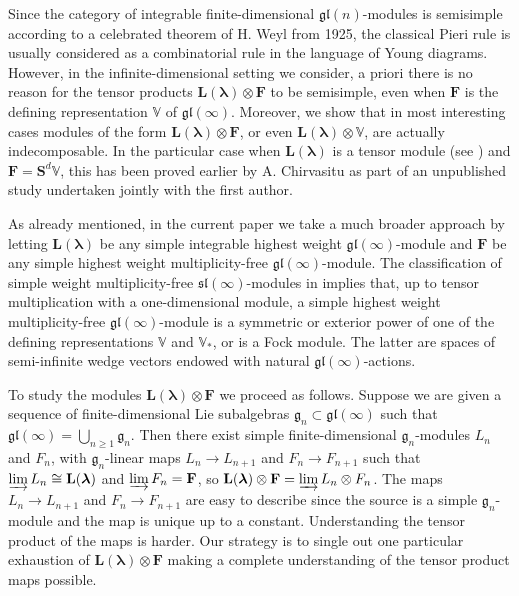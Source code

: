 \documentclass[11pt,fleqn]{amsart}
\renewcommand\to{\longrightarrow}
\theoremstyle{definition}
\theoremstyle{remark}
\theoremstyle{remark}
\newcommand\VV{\mathbb V}
\newcommand\gl{\mathfrak{gl}}
\renewcommand\sl{\mathfrak{sl}}
\renewcommand\SS{\mathbf S}
\newcommand\lie[1]{\mathfrak{#1}}
\newcommand\wt[1]{\boldsymbol{#1}}
\begin{document}
Since the category of integrable finite-dimensional $\gl(n)$-modules is 
semisimple according to a celebrated theorem of H. Weyl from 1925, the 
classical Pieri rule is usually considered as a combinatorial rule in the 
language of Young diagrams. However, in the infinite-dimensional setting we 
consider, a priori there is no reason for the tensor products $\mathbf 
L(\wt\lambda) \otimes \mathbf F$ to be semisimple, even when $\mathbf F$ is the 
defining representation $\VV$ of $\gl(\infty)$. Moreover, we show that in most 
interesting cases modules of the form $\mathbf L(\wt\lambda) \otimes \mathbf 
F$, or even $\mathbf L(\wt\lambda) \otimes \VV$, are actually indecomposable. 
In the particular case when $\mathbf L(\wt\lambda)$ is a tensor module (see 
\cites{PS11b}) and $\mathbf F = \SS^d\VV$, this has been proved earlier by A. 
Chirvasitu as part of an unpublished study undertaken jointly with the 
first author. 

As already mentioned, in the current paper we take a much broader approach by 
letting $\mathbf L(\wt\lambda)$ be any simple integrable highest weight 
$\gl(\infty)$-module and $\mathbf F$ be any simple highest weight 
multiplicity-free $\gl(\infty)$-module. The classification of simple weight 
multiplicity-free $\sl(\infty)$-modules in \cite{GP20} implies that, up to 
tensor multiplication with a one-dimensional module, a simple highest weight 
multiplicity-free $\gl(\infty)$-module is a symmetric or exterior power of 
one of the defining representations $\VV$ and $\VV_*$, or is a Fock module. The 
latter are spaces of semi-infinite wedge vectors endowed with natural 
$\gl(\infty)$-actions. 

To study the modules $\mathbf L(\wt\lambda) \otimes \mathbf F$ we proceed as 
follows. Suppose we are given a sequence of finite-dimensional Lie subalgebras 
$\lie g_n \subset \gl(\infty)$ such that $\gl(\infty) = \bigcup_{n \geq 1} \lie 
g_n$. Then there exist simple finite-dimensional $\lie g_n$-modules $L_n$ and 
$F_n$, with $\lie g_n$-linear maps $L_n \to L_{n+1}$ and $F_n \to F_{n+1}$
such that $\varinjlim L_n \cong \mathbf L(\wt\lambda)$ and $\varinjlim F_n = 
\mathbf F$, so $\mathbf L(\wt\lambda) \otimes \mathbf F = \varinjlim L_n 
\otimes F_n$. The maps $L_n \to L_{n+1}$ and $F_n \to F_{n+1}$ are easy to 
describe since the source is a simple $\lie g_n$-module and the map is unique
up to a constant. Understanding the tensor product of the maps is harder. Our 
strategy is to single out one particular exhaustion of $\mathbf L(\wt\lambda)
\otimes \mathbf F$ making a complete understanding of the tensor product 
maps possible. 
\end{document}
